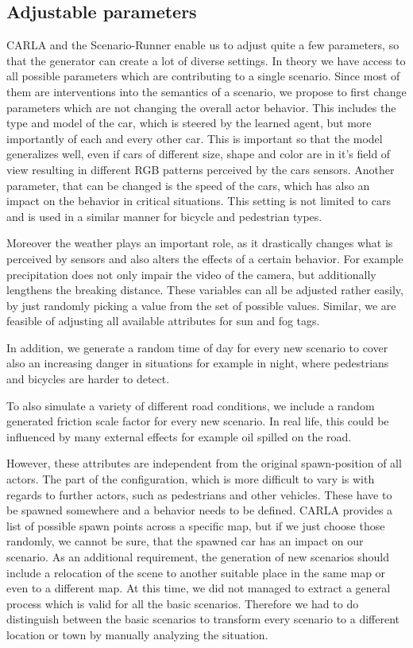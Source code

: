 \documentclass[conference, a4paper, 11pt]{IEEEtran}
\begin{document}
\subsection{Adjustable parameters}

CARLA and the Scenario-Runner enable us to adjust quite a few parameters, so that the generator can create a lot of diverse settings. In theory we have access to all possible parameters which are contributing to a single scenario. Since most of them are interventions into the semantics of a scenario, we propose to first change parameters which are not changing the overall actor behavior.
This includes the type and model of the car, which is steered by the learned agent, but more importantly of each and every other car.
This is important so that the model generalizes well, even if cars of different size, shape and color are in it's field of view resulting in different RGB patterns perceived by the cars sensors.
Another parameter, that can be changed is the speed of the cars, which has also an impact on the behavior in critical situations.
This setting is not limited to cars and is used in a similar manner for bicycle and pedestrian types.

Moreover the weather plays an important role, as it drastically changes what is perceived by sensors and also alters the effects of a certain behavior. For example precipitation does not only impair the video of the camera, but additionally lengthens the breaking distance.
These variables can all be adjusted rather easily, by just randomly picking a value from the set of possible values.
Similar, we are feasible of adjusting all available attributes for sun and fog tags.

In addition, we generate a random time of day for every new scenario to cover also an increasing danger in situations for example in night, where pedestrians and bicycles are harder to detect.

To also simulate a variety of different road conditions, we include a random generated friction scale factor for every new scenario. In real life, this could be influenced by many external effects for example oil spilled on the road.

However, these attributes are independent from the original spawn-position of all actors. 
The part of the configuration, which is more difficult to vary is with regards to further actors, such as pedestrians and other vehicles. These have to be spawned somewhere and a behavior needs to be defined.
CARLA provides a list of possible spawn points across a specific map, but if we just choose those randomly, we cannot be sure, that the spawned car has an impact on our scenario.
As an additional requirement, the generation of new scenarios should include a relocation of the scene to another suitable place in the same map or even to a different map.
At this time, we did not managed to extract a general process which is valid for all the basic scenarios. Therefore we had to do distinguish between the basic scenarios to transform every scenario to a different location or town by manually analyzing the situation.
\end{document}
